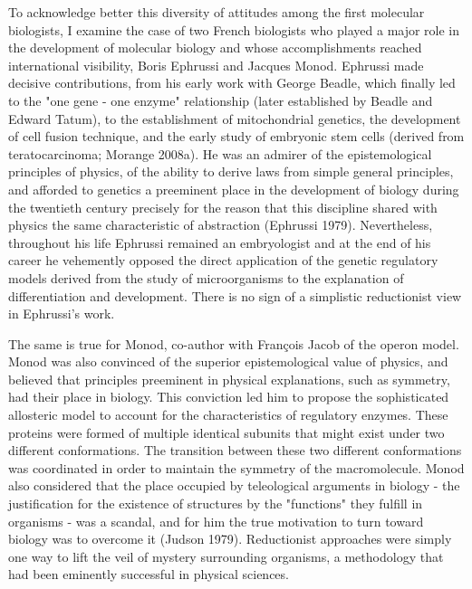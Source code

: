 \begin{longquote}
To acknowledge better this diversity of attitudes among the first
molecular biologists, I examine the case of two French biologists who
played a major role in the development of molecular biology and whose
accomplishments reached international visibility, Boris Ephrussi and
Jacques Monod. Ephrussi made decisive contributions, from his early
work with George Beadle, which finally led to the "one gene - one
enzyme" relationship (later established by Beadle and Edward Tatum),
to the establishment of mitochondrial genetics, the development of cell
fusion technique, and the early study of embryonic stem cells (derived
from teratocarcinoma; Morange 2008a). He was an admirer of the
epistemological principles of physics, of the ability to derive laws from
simple general principles, and afforded to genetics a preeminent place in
the development of biology during the twentieth century precisely for the
reason that this discipline shared with physics the same characteristic of
abstraction (Ephrussi 1979). Nevertheless, throughout his life Ephrussi
remained an embryologist and at the end of his career he vehemently
opposed the direct application of the genetic regulatory models derived
from the study of microorganisms to the explanation of differentiation
and development. There is no sign of a simplistic reductionist view in
Ephrussi's work.

The same is true for Monod, co-author with François Jacob of the
operon model. Monod was also convinced of the superior epistemological
value of physics, and believed that principles preeminent in physical
explanations, such as symmetry, had their place in biology. This
conviction led him to propose the sophisticated allosteric model to
account for the characteristics of regulatory enzymes. These proteins
were formed of multiple identical subunits that might exist under two
different conformations. The transition between these two different
conformations was coordinated in order to maintain the symmetry of
the macromolecule. Monod also considered that the place occupied by
teleological arguments in biology - the justification for the existence of
structures by the "functions" they fulfill in organisms - was a scandal,
and for him the true motivation to turn toward biology was to overcome
 it (Judson 1979). Reductionist approaches were simply one way to lift
the veil of mystery surrounding organisms, a methodology that had been
eminently successful in physical sciences.


\end{longquote}
